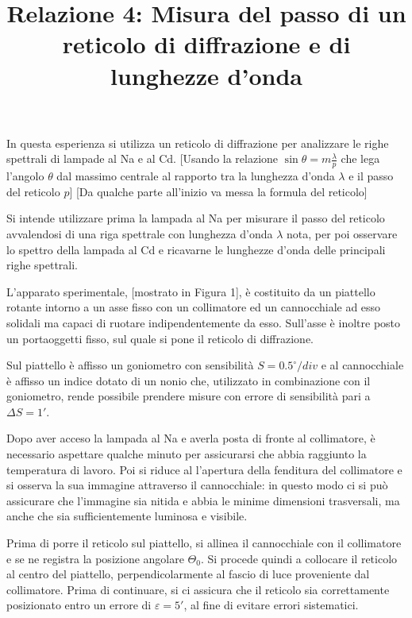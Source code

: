 \documentclass{article}
\title{Relazione 4: Misura del passo di un reticolo di diffrazione
	e di lunghezze d'onda}
\date{}
\begin{document}
	\maketitle
	
	
	In questa esperienza si utilizza un reticolo di diffrazione per analizzare le righe spettrali di lampade al Na e al Cd. [Usando la relazione $\sin{\theta}=m\frac{\lambda}{p}$ che lega l'angolo $\theta$ dal massimo centrale al rapporto tra la lunghezza d'onda $\lambda$ e il passo del reticolo $p$] [Da qualche parte all'inizio va messa la formula del reticolo]
	
	Si intende utilizzare prima la lampada al Na per misurare il passo del reticolo avvalendosi di una riga spettrale con lunghezza d'onda $\lambda$ nota, per poi osservare lo spettro della lampada al Cd e ricavarne le lunghezze d'onda delle principali righe spettrali.
	
	L'apparato sperimentale, [mostrato in Figura 1], è costituito da un piattello rotante intorno a un asse fisso con un collimatore ed un cannocchiale ad esso solidali ma capaci di ruotare indipendentemente da esso. Sull'asse è inoltre posto un portaoggetti fisso, sul quale si pone il reticolo di diffrazione.
	
	Sul piattello è affisso un goniometro con sensibilità $S=0.5^{\circ} / div$ e al cannocchiale è affisso un indice dotato di un nonio che, utilizzato in combinazione con il goniometro, rende possibile prendere misure con errore di sensibilità pari a $\Delta S = 1'$.

 Dopo aver acceso la lampada al Na e averla posta di fronte al collimatore, è necessario aspettare qualche minuto per assicurarsi che abbia raggiunto la temperatura di lavoro. Poi si riduce al l'apertura della fenditura del collimatore e si osserva la sua immagine attraverso il cannocchiale: in questo modo ci si può assicurare che l'immagine sia nitida e abbia le minime dimensioni trasversali, ma anche che sia sufficientemente luminosa e visibile.

Prima di porre il reticolo sul piattello, si allinea il cannocchiale con il collimatore e se ne registra la posizione angolare $\Theta_0$. Si procede quindi a collocare il reticolo al centro del piattello, perpendicolarmente al fascio di luce proveniente dal collimatore. Prima di continuare, si ci assicura che il reticolo sia correttamente posizionato entro un errore di $\varepsilon = 5'$, al fine di evitare errori sistematici.
 
\end{document}
